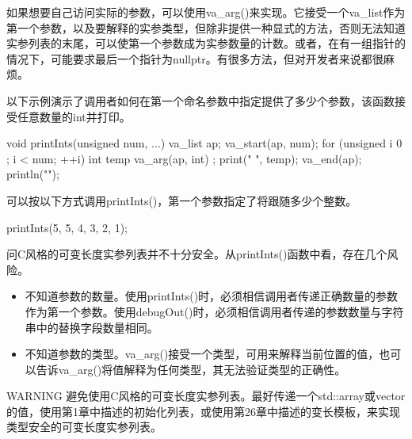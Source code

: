 
如果想要自己访问实际的参数，可以使用va\_arg()来实现。它接受一个va\_list作为第一个参数，以及要解释的实参类型，但除非提供一种显式的方法，否则无法知道实参列表的末尾，可以使第一个参数成为实参数量的计数。或者，在有一组指针的情况下，可能要求最后一个指针为nullptr。有很多方法，但对开发者来说都很麻烦。

以下示例演示了调用者如何在第一个命名参数中指定提供了多少个参数，该函数接受任意数量的int并打印。

\begin{cpp}
void printInts(unsigned num, ...)
{
    va_list ap;
    va_start(ap, num);
    for (unsigned i { 0 }; i < num; ++i) {
        int temp { va_arg(ap, int) };
        print("{} ", temp);
    }
    va_end(ap);
    println("");
}
\end{cpp}

可以按以下方式调用printInts()，第一个参数指定了将跟随多少个整数。

\begin{cpp}
printInts(5, 5, 4, 3, 2, 1);
\end{cpp}


问C风格的可变长度实参列表并不十分安全。从printInts()函数中看，存在几个风险。

\begin{itemize}
\item
不知道参数的数量。使用printInts()时，必须相信调用者传递正确数量的参数作为第一个参数。使用debugOut()时，必须相信调用者传递的参数数量与字符串中的替换字段数量相同。

\item
不知道参数的类型。va\_arg()接受一个类型，可用来解释当前位置的值，也可以告诉va\_arg()将值解释为任何类型，其无法验证类型的正确性。
\end{itemize}

\begin{myWarning}{WARNING}
避免使用C风格的可变长度实参列表。最好传递一个std::array或vector的值，使用第1章中描述的初始化列表，或使用第26章中描述的变长模板，来实现类型安全的可变长度实参列表。
\end{myWarning}














